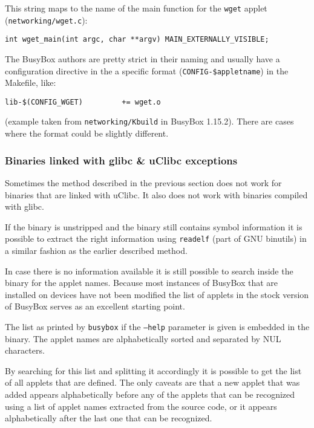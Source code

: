 \documentclass[10pt]{article}
\begin{document}
This string maps to the name of the main function for the \texttt{wget} applet
(\texttt{networking/wget.c}):

\begin{verbatim}
int wget_main(int argc, char **argv) MAIN_EXTERNALLY_VISIBLE;
\end{verbatim}

The BusyBox authors are pretty strict in their naming and usually have a
configuration directive in the a specific format
(\texttt{CONFIG-\$appletname}) in the Makefile, like:

\begin{verbatim}
lib-$(CONFIG_WGET)         += wget.o
\end{verbatim}

(example taken from \texttt{networking/Kbuild} in BusyBox 1.15.2). There are
cases where the format could be slightly different.

\subsubsection{Binaries linked with glibc \& uClibc exceptions}

Sometimes the method described in the previous section does not work for
binaries that are linked with uClibc. It also does not work with binaries
compiled with glibc.

If the binary is unstripped and the binary still contains symbol information
it is possible to extract the right information using \texttt{readelf} (part
of GNU binutils) in a similar fashion as the earlier described method.

In case there is no information available it is still possible to search inside
the binary for the applet names. Because most instances of BusyBox that are
installed on devices have not been modified the list of applets in the stock
version of BusyBox serves as an excellent starting point.

The list as printed by \texttt{busybox} if the \texttt{--help} parameter is
given is embedded in the binary. The applet names are alphabetically sorted
and separated by NUL characters.

By searching for this list and splitting it accordingly it is possible to get
the list of all applets that are defined. The only caveats are that a new
applet that was added appears alphabetically before any of the applets that
can be recognized using a list of applet names extracted from the source code,
or it appears alphabetically after the last one that can be recognized.
\end{document}
